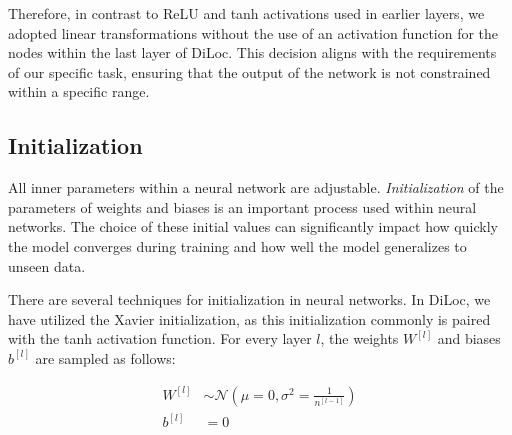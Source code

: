 \documentclass[a4paper, UKenglish, 11pt]{uiomaster}
\begin{document}
Therefore, in contrast to ReLU and tanh activations used in earlier layers, we adopted linear transformations without the use of an activation function for the nodes within the last layer of DiLoc. This decision aligns with the requirements of our specific task, ensuring that the output of the network is not constrained within a specific range.


%

\subsection{Initialization}
All inner parameters within a neural network are adjustable. \emph{Initialization} of the parameters of weights and biases is an important process used within neural networks. The choice of these initial values can significantly impact how quickly the model converges during training and how well the model generalizes to unseen data.

There are several techniques for initialization in neural networks. In DiLoc, we have utilized the Xavier initialization, as this initialization commonly is paired with the tanh activation function. For every layer $l$, the weights $W^{[l]}$ and biases $b^{[l]}$ are sampled as follows:

\begin{align}
W^{[l]} &\sim \mathcal{N}(\mu=0, \sigma^2 = \frac{1}{n^{[l-1]}}) \\
b^{[l]} &= 0
\end{align}
\end{document}
